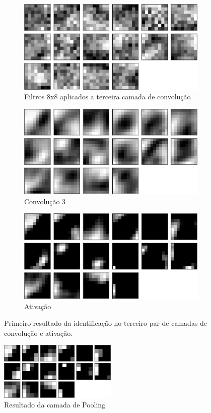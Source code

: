 \documentclass[
	12pt,				%
	oneside,			%
	a4paper,			%
	english,			%
	french,				%
	spanish,			%
	brazil,				%
	]{abntex2}
\begin{document}
\begin{center}
\begin{figure}
	\begin{subfigure}{.8\textwidth}
		\centering
		\includegraphics[width=.6\linewidth]{images/fabio/resultados/network_3/filter_convolution2d_3}%
		\caption{Filtros 8x8 aplicados a terceira camada de convolução}		
		\label{fig:filtros8x8}	
	\end{subfigure}%
	
	\begin{subfigure}{.8\textwidth}
		\centering
		\includegraphics[width=.6\linewidth]{images/fabio/resultados/network_3/input_1_layer_convolution2d_3}
		\caption{Convolução 3}
	\end{subfigure}%
	
	\begin{subfigure}{.8\textwidth}
		\centering
		\includegraphics[width=.6\linewidth]{images/fabio/resultados/network_3/input_1_layer_activation_3}%
		\caption{Ativação}			
	\end{subfigure}%
	\label{fig:camada_3}
	\caption{Primeiro resultado da identificação no terceiro par de camadas de convolução e ativação.}
\end{figure}
\end{center}
\begin{center}
\begin{figure}
	\centering
	\includegraphics[width=0.5\textwidth]{images/fabio/resultados/network_3/input_1_layer_maxpooling2d_1}
	\caption{Resultado da camada de Pooling}
	\label{fig:input1layermaxpooling2d1}
\end{figure}
\end{center}
\end{document}
